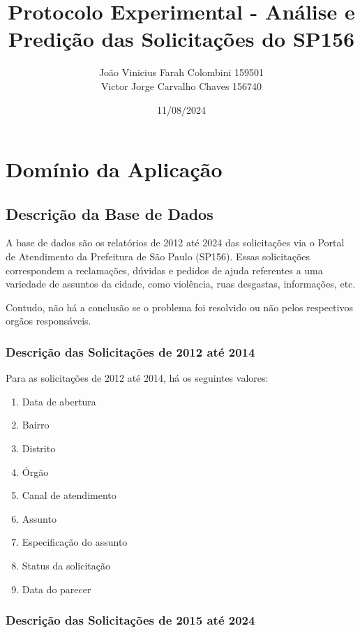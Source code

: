 \documentclass[a4paper,12pt]{article}
\title{Protocolo Experimental - Análise e Predição das Solicitações do SP156}
\author{João Vinicius Farah Colombini 159501\\
Victor Jorge Carvalho Chaves 156740}
\date{11/08/2024}
\begin{document}
\maketitle

\tableofcontents
\newpage

\section{Domínio da Aplicação}

\subsection{Descrição da Base de Dados}

A base de dados são os relatórios de 2012 até 2024 das solicitações via o Portal de Atendimento da Prefeitura de São Paulo (SP156). Essas solicitações correspondem a reclamações, dúvidas e pedidos de ajuda referentes a uma variedade de assuntos da cidade, como violência, ruas desgastas, informações, etc.

Contudo, não há a conclusão se o problema foi resolvido ou não pelos respectivos orgãos responsáveis.

\subsubsection{Descrição das Solicitações de 2012 até 2014}

Para as solicitações de 2012 até 2014, há os seguintes valores:
\begin{enumerate}
    \item Data de abertura
    \item Bairro
    \item Distrito
    \item Órgão
    \item Canal de atendimento
    \item Assunto
    \item Especificação do assunto
    \item Status da solicitação
    \item Data do parecer
\end{enumerate}

\subsubsection{Descrição das Solicitações de 2015 até 2024}
\end{document}
